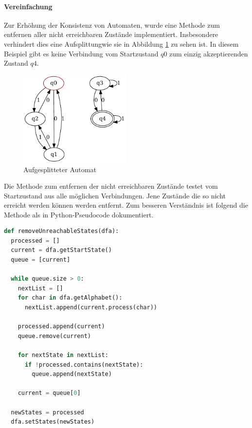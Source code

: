 \paragraph{Vereinfachung}
Zur Erhöhung der Konsistenz von Automaten, wurde eine Methode zum entfernen aller nicht erreichbaren Zustände implementiert. Insbesondere verhindert dies eine \flqq Aufsplittung\frqq wie sie in Abbildung \ref{fig:split_dfa} zu sehen ist. In diesem Beispiel gibt es keine Verbindung vom Startzustand $q0$ zum einzig akzeptierenden Zustand $q4$.

\begin{figure}[H]
  \centering
  \includegraphics[width=0.5\textwidth]{images/split_automaton.pdf}
  \caption[Aufgesplitteter Automat]{Aufgesplitteter Automat}
  \label{fig:split_dfa}
\end{figure}

Die Methode zum entfernen der nicht erreichbaren Zustände testet vom Startzustand aus alle möglichen Verbindungen. Jene Zustände die so nicht erreicht werden können werden entfernt. Zum besseren Verständnis ist folgend die Methode als in Python-Pseudocode dokumentiert.  

\begin{lstlisting}[language=Python, caption={Algorithmus zum entfernen von nicht erreichbaren Zuständen}, label={lst:remove_unreachable_states}]
def removeUnreachableStates(dfa):
  processed = []
  current = dfa.getStartState()
  queue = [current]
  
  while queue.size > 0:
    nextList = []
    for char in dfa.getAlphabet():
      nextList.append(current.process(char))

    processed.append(current)
    queue.remove(current)

    for nextState in nextList:
      if !processed.contains(nextState):
        queue.append(nextState)

    current = queue[0]

  newStates = processed
  dfa.setStates(newStates)
\end{lstlisting}


